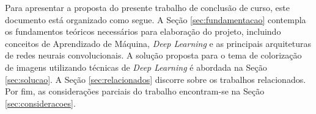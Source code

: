 Para apresentar a proposta do presente trabalho de conclusão de curso, este documento está organizado como segue. A Seção \ref{sec:fundamentacao} contempla os fundamentos teóricos necessários para elaboração do projeto, incluindo conceitos de Aprendizado de Máquina, \textit{Deep Learning} e as principais arquiteturas de redes neurais convolucionais.  A solução proposta para o tema de colorização de imagens utilizando técnicas de \textit{Deep Learning} é abordada na Seção \ref{sec:solucao}. A Seção \ref{sec:relacionados} discorre sobre os trabalhos relacionados. Por fim, as considerações parciais do trabalho encontram-se na Seção \ref{sec:consideracoes}.